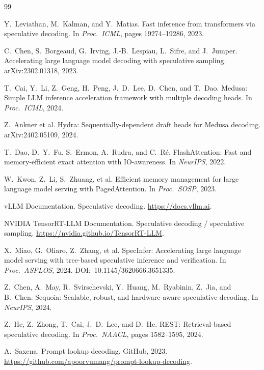 \documentclass[letterpaper,twocolumn,10pt]{article}
\begin{document}
{\small
\begin{thebibliography}{99}

Y.~Leviathan, M.~Kalman, and Y.~Matias.
Fast inference from transformers via speculative decoding.
In \emph{Proc.\ ICML}, pages 19274--19286, 2023.

C.~Chen, S.~Borgeaud, G.~Irving, J.-B.~Lespiau, L.~Sifre, and J.~Jumper.
Accelerating large language model decoding with speculative sampling.
arXiv:2302.01318, 2023.

T.~Cai, Y.~Li, Z.~Geng, H.~Peng, J.~D.~Lee, D.~Chen, and T.~Dao.
Medusa: Simple LLM inference acceleration framework with multiple decoding heads.
In \emph{Proc.\ ICML}, 2024.

Z.~Ankner et al.
Hydra: Sequentially-dependent draft heads for Medusa decoding.
arXiv:2402.05109, 2024.

T.~Dao, D.~Y.~Fu, S.~Ermon, A.~Rudra, and C.~R\'e.
FlashAttention: Fast and memory-efficient exact attention with IO-awareness.
In \emph{NeurIPS}, 2022.

W.~Kwon, Z.~Li, S.~Zhuang, et al.
Efficient memory management for large language model serving with PagedAttention.
In \emph{Proc.\ SOSP}, 2023.

vLLM Documentation.
Speculative decoding.
\url{https://docs.vllm.ai}.

NVIDIA TensorRT-LLM Documentation.
Speculative decoding / speculative sampling.
\url{https://nvidia.github.io/TensorRT-LLM}.

X.~Miao, G.~Oliaro, Z.~Zhang, et al.
SpecInfer: Accelerating large language model serving with tree-based speculative inference and verification.
In \emph{Proc.\ ASPLOS}, 2024. DOI:~10.1145/3620666.3651335.

Z.~Chen, A.~May, R.~Svirschevski, Y.~Huang, M.~Ryabinin, Z.~Jia, and B.~Chen.
Sequoia: Scalable, robust, and hardware-aware speculative decoding.
In \emph{NeurIPS}, 2024.

Z.~He, Z.~Zhong, T.~Cai, J.~D.~Lee, and D.~He.
REST: Retrieval-based speculative decoding.
In \emph{Proc.\ NAACL}, pages 1582--1595, 2024.

A.~Saxena.
Prompt lookup decoding.
GitHub, 2023.
\url{https://github.com/apoorvumang/prompt-lookup-decoding}.


\end{thebibliography}}
\end{document}
